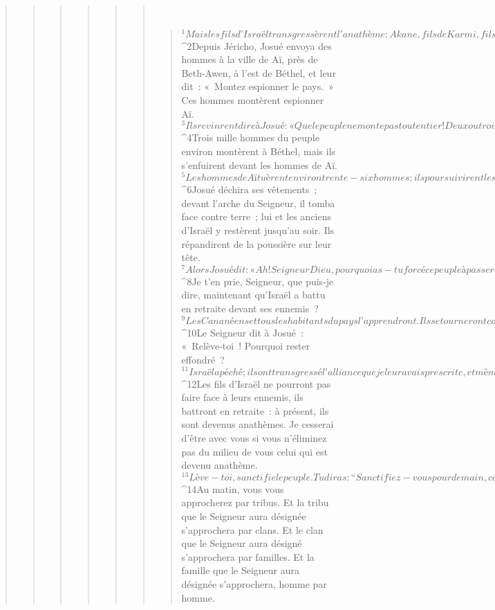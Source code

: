 \begin{verse}
\begin{verse}
\begin{verse}
\begin{verse}
\begin{verse}
\begin{verse}
         
      \bchapter{}
      \begin{verse}
${}^{1}Mais les fils d’Israël transgressèrent l’anathème : Akane, fils de Karmi, fils de Zabdi, fils de Zèrah, de la tribu de Juda, prit ce qui était voué à l’anathème, et la colère du Seigneur s’enflamma contre les fils d’Israël.
${}^{2}Depuis Jéricho, Josué envoya des hommes à la ville de Aï, près de Beth-Awen, à l’est de Béthel, et leur dit : « Montez espionner le pays. » Ces hommes montèrent espionner Aï. 
${}^{3}Ils revinrent dire à Josué : « Que le peuple ne monte pas tout entier ! Deux ou trois mille hommes monteront, et ils battront Aï. Ne fatigue pas là tout le peuple, car ces gens sont peu nombreux. » 
${}^{4}Trois mille hommes du peuple environ montèrent à Béthel, mais ils s’enfuirent devant les hommes de Aï. 
${}^{5}Les hommes de Aï tuèrent environ trente-six hommes ; ils poursuivirent les autres au-delà de la porte de la ville, jusqu’à Shebarim, et les battirent dans la descente. Alors, le peuple perdit courage, et son cœur fondit.
${}^{6}Josué déchira ses vêtements ; devant l’arche du Seigneur, il tomba face contre terre ; lui et les anciens d’Israël y restèrent jusqu’au soir. Ils répandirent de la poussière sur leur tête. 
${}^{7}Alors Josué dit : « Ah ! Seigneur Dieu, pourquoi as-tu forcé ce peuple à passer le Jourdain ? Est-ce pour nous livrer aux mains des Amorites et nous faire périr ? Si seulement nous avions décidé de rester en deçà du Jourdain ! 
${}^{8}Je t’en prie, Seigneur, que puis-je dire, maintenant qu’Israël a battu en retraite devant ses ennemis ? 
${}^{9}Les Cananéens et tous les habitants du pays l’apprendront. Ils se tourneront contre nous pour retrancher notre nom de la terre. Que pourras-tu faire alors pour ton grand nom ? »
${}^{10}Le Seigneur dit à Josué : « Relève-toi ! Pourquoi rester effondré ? 
${}^{11}Israël a péché ; ils ont transgressé l’alliance que je leur avais prescrite, et même ils ont pris ce qui était voué à l’anathème, ils l’ont volé, dissimulé et mis dans leurs affaires. 
${}^{12}Les fils d’Israël ne pourront pas faire face à leurs ennemis, ils battront en retraite : à présent, ils sont devenus anathèmes. Je cesserai d’être avec vous si vous n’éliminez pas du milieu de vous celui qui est devenu anathème. 
${}^{13}Lève-toi, sanctifie le peuple. Tu diras : “Sanctifiez-vous pour demain, car ainsi parle le Seigneur, Dieu d’Israël : Un anathème est au milieu de toi, Israël. Tu ne pourras pas faire face à tes ennemis, tant que vous n’aurez pas écarté l’anathème du milieu de vous.” 
${}^{14}Au matin, vous vous approcherez par tribus. Et la tribu que le Seigneur aura désignée s’approchera par clans. Et le clan que le Seigneur aura désigné s’approchera par familles. Et la famille que le Seigneur aura désignée s’approchera, homme par homme. 

\end{verse}
\end{verse}
\end{verse}
\end{verse}
\end{verse}
\end{verse}
\end{verse}
